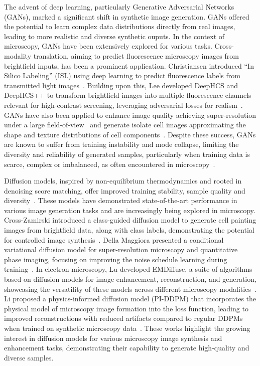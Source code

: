 The advent of deep learning, particularly Generative Adversarial Networks (GANs), marked a significant shift in synthetic image generation.
GANs offered the potential to learn complex data distributions directly from real images, leading to more realistic and diverse synthetic ouputs.
In the context of microscopy, GANs have been extensively explored for various tasks.
Cross-modality translation, aiming to predict fluorescence microscopy images from brightfield inputs, has been a prominent application.
Christiansen \etal introduced ``In Silico Labeling'' (ISL) using deep learning to predict fluorescence labels from transmitted light images~\cite{christiansen_silico_2018}.
Building upon this, Lee \etal developed DeepHCS and DeepHCS++ to transform brightfield images into multiple fluorescence channels relevant for high-contrast screening, leveraging adversarial losses for realism~\cite{gyuhyun_lee_deephcs_2018,gyuhyun_lee_deephcs_2021}.
GANs have also been applied to enhance image quality achieving super-resolution under a large field-of-view~\cite{zhang_high-throughput_2019} and generate isolate cell images approximating the shape and texture distributions of cell components~\cite{marin_scalbert_generic_2019}.
Despite these success, GANs are known to suffer from training instability and mode collapse, limiting the diversity and reliability of generated samples, particularly when training data is scarce, complex or imbalanced, as often encountered in microscopy~\cite{juan_c_caicedo_evaluation_2019,ricard_durall_combating_2020}.


Diffusion models, inspired by non-equilibrium thermodynamics and rooted in denoising score matching, offer improved training stability, sample quality and diversity~\cite{jascha_sohl-dickstein_deep_2015,ho_denoising_2020,song_denoising_2020}.
These models have demonstrated state-of-the-art performance in various image generation tasks and are increasingly being explored in microscopy.
Cross-Zamirski \etal introduced a class-guided diffusion model to generate cell painting images from brightfield data, along with class labels, demonstrating the potential for controlled image synthesis~\cite{cross-zamirski_class-guided_2023}.
Della Maggiora \etal presented a conditional variational diffusion model for super-resolution microscopy and quantitative phase imaging, focusing on improving the noise schedule learning during training~\cite{gabriel_della_maggiora_conditional_2023}.
In electron microscopy, Lu \etal developed EMDiffuse, a suite of algorithms based on diffusion models for image enhancement, reconstruction, and generation, showcasing the versatility of these models across different microscopy modalities~\cite{lu_diffusion-based_2024}.
Li \etal proposed a physics-informed diffusion model (PI-DDPM) that incorporates the physical model of microscopy image formation into the loss function, leading to improved reconstructions with reduced artifacts compared to regular DDPMs when trained on synthetic microscopy data~\cite{li_microscopy_2023}.
These works highlight the growing interest in diffusion models for various microscopy image synthesis and enhancement tasks, demonstrating their capability to generate high-quality and diverse samples.

